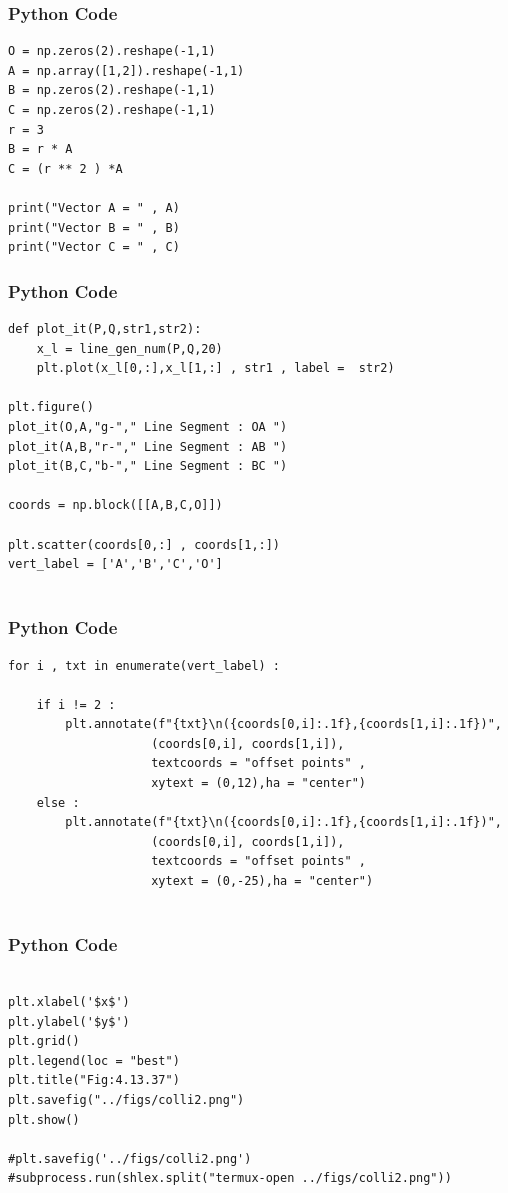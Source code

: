 \documentclass{beamer}
\begin{document}
\begin{frame}[fragile]
    \frametitle{Python Code }
    \begin{lstlisting}
O = np.zeros(2).reshape(-1,1)
A = np.array([1,2]).reshape(-1,1)
B = np.zeros(2).reshape(-1,1)
C = np.zeros(2).reshape(-1,1)
r = 3 
B = r * A
C = (r ** 2 ) *A

print("Vector A = " , A)
print("Vector B = " , B)
print("Vector C = " , C)

\end{lstlisting}
\end{frame}

\begin{frame}[fragile]
    \frametitle{Python Code }
    \begin{lstlisting}
def plot_it(P,Q,str1,str2):
    x_l = line_gen_num(P,Q,20)
    plt.plot(x_l[0,:],x_l[1,:] , str1 , label =  str2)

plt.figure()
plot_it(O,A,"g-"," Line Segment : OA ")
plot_it(A,B,"r-"," Line Segment : AB ")
plot_it(B,C,"b-"," Line Segment : BC ")

coords = np.block([[A,B,C,O]])

plt.scatter(coords[0,:] , coords[1,:])
vert_label = ['A','B','C','O']


\end{lstlisting}
\end{frame}

\begin{frame}[fragile]
    \frametitle{Python Code }
    \begin{lstlisting}
for i , txt in enumerate(vert_label) :
    
    if i != 2 :
        plt.annotate(f"{txt}\n({coords[0,i]:.1f},{coords[1,i]:.1f})",
                    (coords[0,i], coords[1,i]),
                    textcoords = "offset points" ,
                    xytext = (0,12),ha = "center")
    else :
        plt.annotate(f"{txt}\n({coords[0,i]:.1f},{coords[1,i]:.1f})",
                    (coords[0,i], coords[1,i]),
                    textcoords = "offset points" ,
                    xytext = (0,-25),ha = "center")
                 
    \end{lstlisting}
\end{frame}
\begin{frame}[fragile]
    \frametitle{Python Code }
    \begin{lstlisting}
   
plt.xlabel('$x$')
plt.ylabel('$y$')
plt.grid()
plt.legend(loc = "best")
plt.title("Fig:4.13.37")
plt.savefig("../figs/colli2.png")
plt.show()

#plt.savefig('../figs/colli2.png')
#subprocess.run(shlex.split("termux-open ../figs/colli2.png"))

    \end{lstlisting}
\end{frame}
\end{document}
